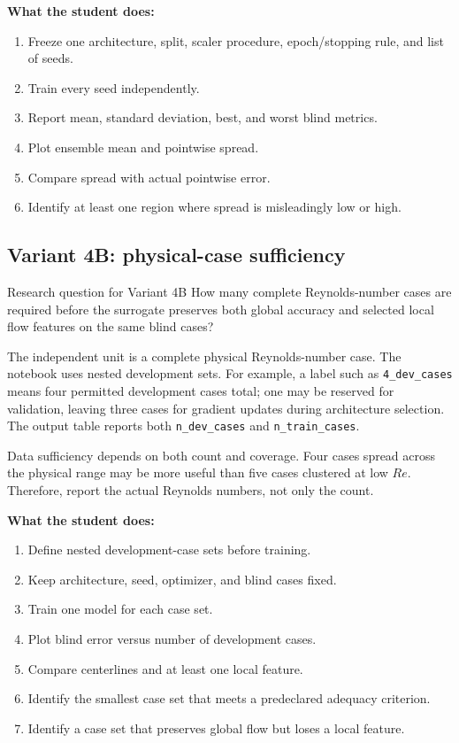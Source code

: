 \documentclass[11pt]{article}
\begin{document}
\textbf{What the student does:}
\begin{enumerate}
\item Freeze one architecture, split, scaler procedure, epoch/stopping rule, and list of seeds.
\item Train every seed independently.
\item Report mean, standard deviation, best, and worst blind metrics.
\item Plot ensemble mean and pointwise spread.
\item Compare spread with actual pointwise error.
\item Identify at least one region where spread is misleadingly low or high.
\end{enumerate}

\subsection{Variant 4B: physical-case sufficiency}
\begin{projectbox}{Research question for Variant 4B}
How many complete Reynolds-number cases are required before the surrogate preserves both global accuracy and selected local flow features on the same blind cases?
\end{projectbox}

The independent unit is a complete physical Reynolds-number case. The notebook uses nested development sets. For example, a label such as \texttt{4\_dev\_cases} means four permitted development cases total; one may be reserved for validation, leaving three cases for gradient updates during architecture selection. The output table reports both \texttt{n\_dev\_cases} and \texttt{n\_train\_cases}.

Data sufficiency depends on both count and coverage. Four cases spread across the physical range may be more useful than five cases clustered at low $Re$. Therefore, report the actual Reynolds numbers, not only the count.

\textbf{What the student does:}
\begin{enumerate}
\item Define nested development-case sets before training.
\item Keep architecture, seed, optimizer, and blind cases fixed.
\item Train one model for each case set.
\item Plot blind error versus number of development cases.
\item Compare centerlines and at least one local feature.
\item Identify the smallest case set that meets a predeclared adequacy criterion.
\item Identify a case set that preserves global flow but loses a local feature.
\end{enumerate}
\end{document}
